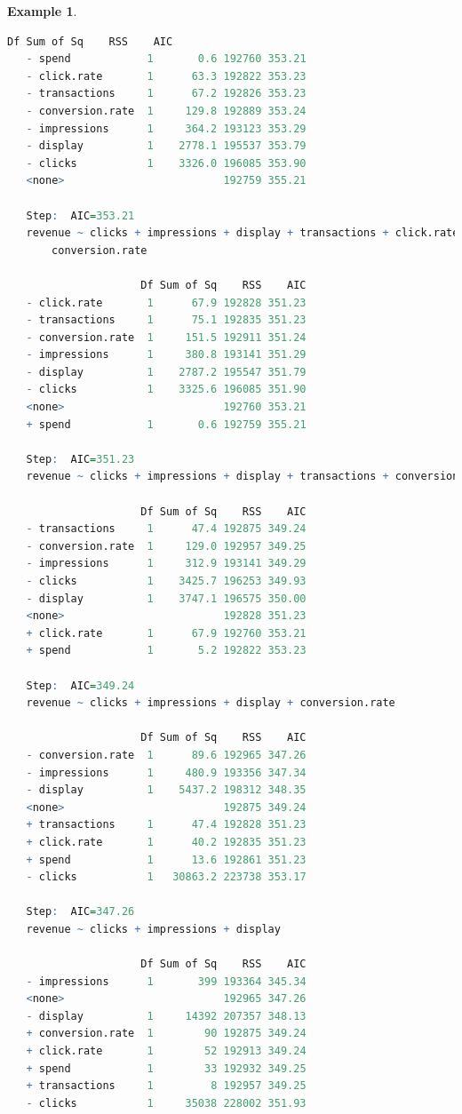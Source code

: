 \documentclass[
  11pt,
]{book}
\theoremstyle{definition}
\theoremstyle{definition}
\newtheorem{example}{Example}[chapter]
\theoremstyle{definition}
\theoremstyle{definition}
\theoremstyle{remark}
\begin{document}
\begin{example}
\begin{lstlisting}[language=R]
                     Df Sum of Sq    RSS    AIC
   - spend            1       0.6 192760 353.21
   - click.rate       1      63.3 192822 353.23
   - transactions     1      67.2 192826 353.23
   - conversion.rate  1     129.8 192889 353.24
   - impressions      1     364.2 193123 353.29
   - display          1    2778.1 195537 353.79
   - clicks           1    3326.0 196085 353.90
   <none>                         192759 355.21
   
   Step:  AIC=353.21
   revenue ~ clicks + impressions + display + transactions + click.rate + 
       conversion.rate
   
                     Df Sum of Sq    RSS    AIC
   - click.rate       1      67.9 192828 351.23
   - transactions     1      75.1 192835 351.23
   - conversion.rate  1     151.5 192911 351.24
   - impressions      1     380.8 193141 351.29
   - display          1    2787.2 195547 351.79
   - clicks           1    3325.6 196085 351.90
   <none>                         192760 353.21
   + spend            1       0.6 192759 355.21
   
   Step:  AIC=351.23
   revenue ~ clicks + impressions + display + transactions + conversion.rate
   
                     Df Sum of Sq    RSS    AIC
   - transactions     1      47.4 192875 349.24
   - conversion.rate  1     129.0 192957 349.25
   - impressions      1     312.9 193141 349.29
   - clicks           1    3425.7 196253 349.93
   - display          1    3747.1 196575 350.00
   <none>                         192828 351.23
   + click.rate       1      67.9 192760 353.21
   + spend            1       5.2 192822 353.23
   
   Step:  AIC=349.24
   revenue ~ clicks + impressions + display + conversion.rate
   
                     Df Sum of Sq    RSS    AIC
   - conversion.rate  1      89.6 192965 347.26
   - impressions      1     480.9 193356 347.34
   - display          1    5437.2 198312 348.35
   <none>                         192875 349.24
   + transactions     1      47.4 192828 351.23
   + click.rate       1      40.2 192835 351.23
   + spend            1      13.6 192861 351.23
   - clicks           1   30863.2 223738 353.17
   
   Step:  AIC=347.26
   revenue ~ clicks + impressions + display
   
                     Df Sum of Sq    RSS    AIC
   - impressions      1       399 193364 345.34
   <none>                         192965 347.26
   - display          1     14392 207357 348.13
   + conversion.rate  1        90 192875 349.24
   + click.rate       1        52 192913 349.24
   + spend            1        33 192932 349.25
   + transactions     1         8 192957 349.25
   - clicks           1     35038 228002 351.93
   

\end{lstlisting}
\end{example}
\end{document}
